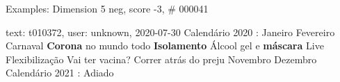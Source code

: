\begin{frame}{Examples: Dimension 5 neg, score -3, \# 000041}
\footnotesize
\begin{alertblock}{text: t010372, user: unknown, 2020-07-30}
Calendário 2020 : Janeiro Fevereiro Carnaval \textbf{Corona} no mundo todo 
\textbf{Isolamento} Álcool gel e \textbf{máscara} Live Flexibilização Vai ter 
vacina? Correr atrás do preju Novembro Dezembro Calendário 2021 : Adiado 
\end{alertblock}
\end{frame}
